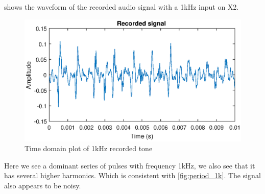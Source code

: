  shows the waveform of the recorded audio signal with a 1kHz input on X2.

\begin{figure}[H]
    \centering
    \includegraphics[trim={0cm 1.6cm 0cm 2cm},clip,width=\textwidth]{img/Recorded_1khz-09.eps}
    \caption{Time domain plot of 1kHz recorded tone}
    \label{fig:recorded_1k}
\end{figure}

Here we see a dominant series of pulses with frequency 1kHz, we also see that it has several higher harmonics. Which is consistent with \cref{fig:period_1k}. The signal also appears to be noisy.


